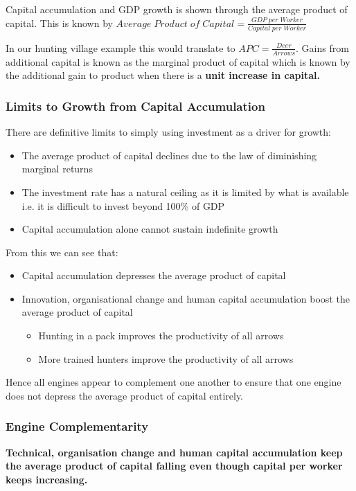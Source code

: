 \documentclass[12pt, letterpaper]{article}
\begin{document}
Capital accumulation and GDP growth is shown through the average product of capital. This is known by $Average\;Product\;of\;Capital = \frac{GDP\;per\;Worker}{Capital\;per\;Worker}$

In our hunting village example this would translate to $APC = \frac{Deer}{Arrows}$. Gains from additional capital is known as the marginal product of capital which is known by the additional gain to product when there is a \textbf{unit increase in capital.}

\subsubsection{Limits to Growth from Capital Accumulation}
There are definitive limits to simply using investment as a driver for growth:
\begin{itemize}
	\item The average product of capital declines due to the law of diminishing marginal returns
	\item The investment rate has a natural ceiling as it is limited by what is available i.e. it is difficult to invest beyond 100\% of GDP
	\item Capital accumulation alone cannot sustain indefinite growth
\end{itemize}
From this we can see that:
\begin{itemize}
	\item Capital accumulation depresses the average product of capital
	\item Innovation, organisational change and human capital accumulation boost the average product of capital
		\begin{itemize}
			\item Hunting in a pack improves the productivity of all arrows
			\item More trained hunters improve the productivity of all arrows
		\end{itemize}
\end{itemize}
Hence all engines appear to complement one another to ensure that one engine does not depress the average product of capital entirely.

\subsubsection{Engine Complementarity}
\textbf{Technical, organisation change and human capital accumulation keep the average product of capital falling even though capital per worker keeps increasing.}
\end{document}
